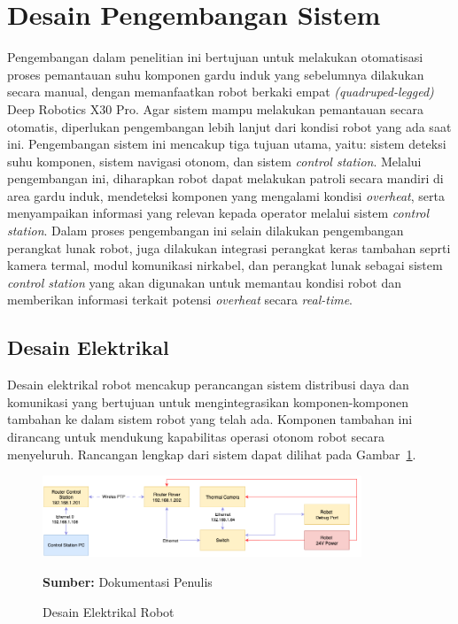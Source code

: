 \section{Desain Pengembangan Sistem}
Pengembangan dalam penelitian ini bertujuan untuk melakukan otomatisasi proses pemantauan suhu komponen gardu induk yang sebelumnya dilakukan secara manual, dengan memanfaatkan robot berkaki empat \emph{(quadruped-legged)} Deep Robotics X30 Pro. Agar sistem mampu melakukan pemantauan secara otomatis, diperlukan pengembangan lebih lanjut dari kondisi robot yang ada saat ini. Pengembangan sistem ini mencakup tiga tujuan utama, yaitu: sistem deteksi suhu komponen, sistem navigasi otonom, dan sistem \emph{control station}. Melalui pengembangan ini, diharapkan robot dapat melakukan patroli secara mandiri di area gardu induk, mendeteksi komponen yang mengalami kondisi \emph{overheat}, serta menyampaikan informasi yang relevan kepada operator melalui sistem \emph{control station}. Dalam proses pengembangan ini selain dilakukan pengembangan perangkat lunak robot, juga dilakukan integrasi perangkat keras tambahan seprti kamera termal, modul komunikasi nirkabel, dan perangkat lunak sebagai sistem \emph{control station} yang akan digunakan untuk memantau kondisi robot dan memberikan informasi terkait potensi \emph{overheat} secara \emph{real-time}.

\subsection{Desain Elektrikal}

Desain elektrikal robot mencakup perancangan sistem distribusi daya dan komunikasi yang bertujuan untuk mengintegrasikan komponen-komponen tambahan ke dalam sistem robot yang telah ada. Komponen tambahan ini dirancang untuk mendukung kapabilitas operasi otonom robot secara menyeluruh. Rancangan lengkap dari sistem dapat dilihat pada Gambar~\ref{fig:electrical}.

\begin{figure}[H]
  \centering
  \includegraphics[width=0.85\textwidth]{gambar/bab3/electrical-design.png}
  \caption{Desain Elektrikal Robot}
  \label{fig:electrical}
  \footnotesize{\textbf{Sumber:} Dokumentasi Penulis}
\end{figure}

